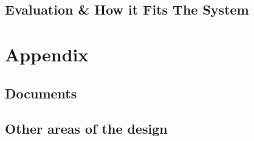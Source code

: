 \documentclass{article}
\begin{document}
\subsection{Evaluation \& How it Fits The System}\label{ssec:app-evaluation}



\printbibliography

\section{Appendix}\label{sec:appendix}
\subsection{Documents}\label{ssec:appendix-docs}

\subsection{Other areas of the design}\label{ssec:appendix-other}

%
%
%
%
%
%
%
%
%
%
%
%
%
%
%
%
%
%
%
%
%
%
%
%
%
%
%
%
%
%
%
%
%
%
%
\end{document}

